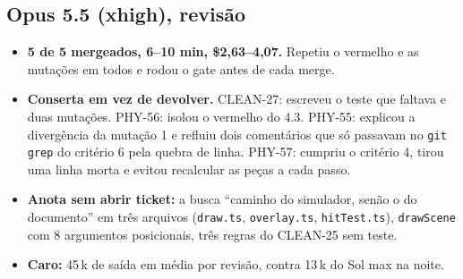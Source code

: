 \documentclass[11pt,a4paper]{article}
\begin{document}
\subsection*{Opus 5.5 (xhigh), revisão}
\begin{itemize}
  \item \textbf{5 de 5 mergeados, 6--10 min, \$2,63--4,07.} Repetiu o vermelho
        e as mutações em todos e rodou o gate antes de cada merge.
  \item \textbf{Conserta em vez de devolver.} CLEAN-27: escreveu o teste que
        faltava e duas mutações. PHY-56: isolou o vermelho do 4.3. PHY-55:
        explicou a divergência da mutação 1 e refluiu dois comentários que só
        passavam no \texttt{git grep} do critério 6 pela quebra de linha.
        PHY-57: cumpriu o critério 4, tirou uma linha morta e evitou recalcular
        as peças a cada passo.
  \item \textbf{Anota sem abrir ticket:} a busca ``caminho do simulador, senão
        o do documento'' em três arquivos (\texttt{draw.ts},
        \texttt{overlay.ts}, \texttt{hitTest.ts}), \texttt{drawScene} com 8
        argumentos posicionais, três regras do CLEAN-25 sem teste.
  \item \textbf{Caro:} 45\,k de saída em média por revisão, contra 13\,k do Sol
        max na noite.
\end{itemize}
\end{document}
